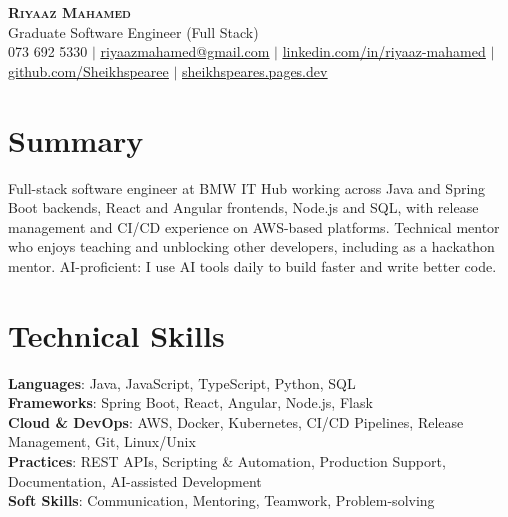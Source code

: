 \documentclass[letterpaper,11pt]{article}
\begin{document}
\begin{center}
    \textbf{\Huge \scshape Riyaaz Mahamed} \\ \vspace{1pt}
    \small Graduate Software Engineer (Full Stack) \\ \vspace{1pt}
    \small 073 692 5330 $|$ \href{mailto:riyaazmahamed@gmail.com}{\underline{riyaazmahamed@gmail.com}} $|$
    \href{https://www.linkedin.com/in/riyaaz-mahamed}{\underline{linkedin.com/in/riyaaz-mahamed}} $|$
    \href{https://github.com/Sheikhspearee}{\underline{github.com/Sheikhspearee}} $|$
    \href{https://sheikhspeares.pages.dev}{\underline{sheikhspeares.pages.dev}}
\end{center}

\section{Summary}
\small{Full-stack software engineer at BMW IT Hub working across Java and Spring Boot backends, React and Angular frontends, Node.js and SQL, with release management and CI/CD experience on AWS-based platforms. Technical mentor who enjoys teaching and unblocking other developers, including as a hackathon mentor. AI-proficient: I use AI tools daily to build faster and write better code.}

\section{Technical Skills}
 \begin{itemize}[leftmargin=0.15in, label={}]
    \small{\item{
     \textbf{Languages}{: Java, JavaScript, TypeScript, Python, SQL} \\
     \textbf{Frameworks}{: Spring Boot, React, Angular, Node.js, Flask} \\
     \textbf{Cloud \& DevOps}{: AWS, Docker, Kubernetes, CI/CD Pipelines, Release Management, Git, Linux/Unix} \\
     \textbf{Practices}{: REST APIs, Scripting \& Automation, Production Support, Documentation, AI-assisted Development} \\
     \textbf{Soft Skills}{: Communication, Mentoring, Teamwork, Problem-solving}
    }}
 \end{itemize}

\end{document}
